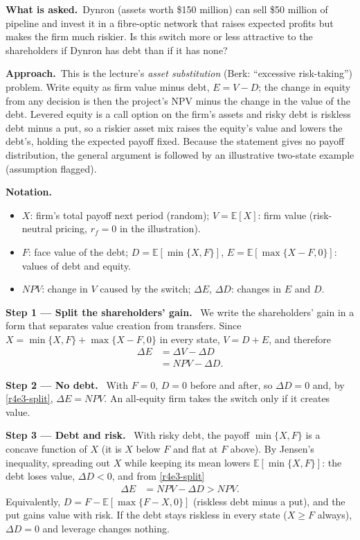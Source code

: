 \documentclass[11pt,a4paper]{article}
\newcommand{\notation}{\par\noindent\textbf{Notation.}}
\newcommand{\step}[2]{\par\medskip\noindent\textbf{Step #1 --- #2.}~}
\newcommand{\asked}{\par\medskip\noindent\textbf{What is asked.}~}
\newcommand{\approach}{\par\smallskip\noindent\textbf{Approach.}~}
\begin{document}
\asked Dynron (assets worth \$150 million) can sell \$50 million of pipeline and invest it in
a fibre-optic network that raises expected profits but makes the firm much riskier. Is this
switch more or less attractive to the shareholders if Dynron has debt than if it has none?

\approach This is the lecture's \emph{asset substitution} (Berk: ``excessive risk-taking'')
problem. Write equity as firm value minus debt, $E=V-D$; the change in equity from any decision
is then the project's NPV minus the change in the value of the debt. Levered equity is a call
option on the firm's assets and risky debt is riskless debt minus a put, so a riskier asset mix
raises the equity's value and lowers the debt's, holding the expected payoff fixed. Because the
statement gives no payoff distribution, the general argument is followed by an illustrative
two-state example (assumption flagged).

\notation
\begin{itemize}
  \item $X$: firm's total payoff next period (random); $V=\mathbb{E}[X]$: firm value (risk-neutral pricing, $r_f=0$ in the illustration).
  \item $F$: face value of the debt; $D=\mathbb{E}[\min\{X,F\}]$, $E=\mathbb{E}[\max\{X-F,0\}]$: values of debt and equity.
  \item $\mathit{NPV}$: change in $V$ caused by the switch; $\Delta E$, $\Delta D$: changes in $E$ and $D$.
\end{itemize}

\step{1}{Split the shareholders' gain} We write the shareholders' gain in a form that separates
value creation from transfers. Since $X=\min\{X,F\}+\max\{X-F,0\}$ in every state, $V=D+E$,
and therefore
\begin{align}
  \Delta E &= \Delta V-\Delta D \nonumber\\
           &= \mathit{NPV}-\Delta D. \label{r4e3-split}
\end{align}

\step{2}{No debt} With $F=0$, $D=0$ before and after, so $\Delta D=0$ and, by \eqref{r4e3-split},
$\Delta E=\mathit{NPV}$. An all-equity firm takes the switch only if it creates value.

\step{3}{Debt and risk} With risky debt, the payoff $\min\{X,F\}$ is a concave function of $X$
(it is $X$ below $F$ and flat at $F$ above). By Jensen's inequality, spreading out $X$ while
keeping its mean lowers $\mathbb{E}[\min\{X,F\}]$: the debt loses value, $\Delta D<0$, and from
\eqref{r4e3-split}
\begin{align}
  \Delta E &= \mathit{NPV}-\Delta D > \mathit{NPV}. \nonumber
\end{align}
Equivalently, $D=F-\mathbb{E}[\max\{F-X,0\}]$ (riskless debt minus a put), and the put gains
value with risk. If the debt stays riskless in every state ($X\ge F$ always), $\Delta D=0$ and
leverage changes nothing.
\end{document}
